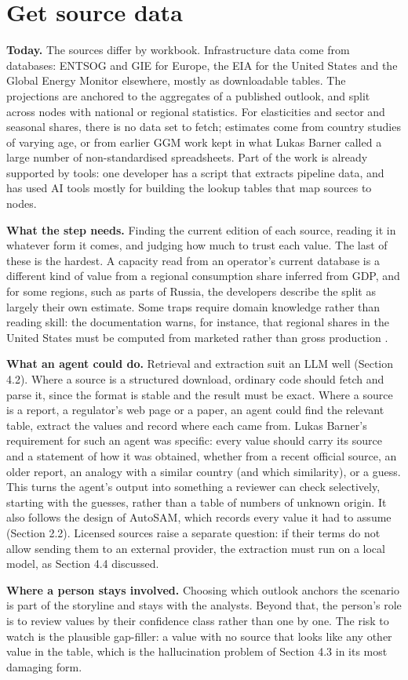 \section{Get source data}

\textbf{Today.} The sources differ by workbook.
Infrastructure data come from databases: ENTSOG and GIE for Europe, the EIA for the United States and the Global Energy Monitor elsewhere, mostly as downloadable tables.
The projections are anchored to the aggregates of a published outlook, and split across nodes with national or regional statistics.
For elasticities and sector and seasonal shares, there is no data set to fetch; estimates come from country studies of varying age, or from earlier GGM work kept in what Lukas Barner called a large number of non-standardised spreadsheets.
Part of the work is already supported by tools: one developer has a script that extracts pipeline data, and has used AI tools mostly for building the lookup tables that map sources to nodes.

\textbf{What the step needs.} Finding the current edition of each source, reading it in whatever form it comes, and judging how much to trust each value.
The last of these is the hardest.
A capacity read from an operator's current database is a different kind of value from a regional consumption share inferred from GDP, and for some regions, such as parts of Russia, the developers describe the split as largely their own estimate.
Some traps require domain knowledge rather than reading skill: the documentation warns, for instance, that regional shares in the United States must be computed from marketed rather than gross production \citep[p.~24]{egging2019global}.

\textbf{What an agent could do.} Retrieval and extraction suit an LLM well (Section 4.2).
Where a source is a structured download, ordinary code should fetch and parse it, since the format is stable and the result must be exact.
Where a source is a report, a regulator's web page or a paper, an agent could find the relevant table, extract the values and record where each came from.
Lukas Barner's requirement for such an agent was specific: every value should carry its source and a statement of how it was obtained, whether from a recent official source, an older report, an analogy with a similar country (and which similarity), or a guess.
This turns the agent's output into something a reviewer can check selectively, starting with the guesses, rather than a table of numbers of unknown origin.
It also follows the design of AutoSAM, which records every value it had to assume (Section 2.2).
Licensed sources raise a separate question: if their terms do not allow sending them to an external provider, the extraction must run on a local model, as Section 4.4 discussed.

\textbf{Where a person stays involved.} Choosing which outlook anchors the scenario is part of the storyline and stays with the analysts.
Beyond that, the person's role is to review values by their confidence class rather than one by one.
The risk to watch is the plausible gap-filler: a value with no source that looks like any other value in the table, which is the hallucination problem of Section 4.3 in its most damaging form.

